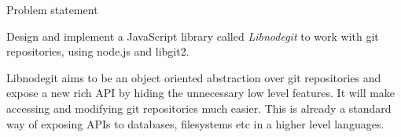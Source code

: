 \begin{center}
  {\huge Problem statement} \\[0.4cm]
\end{center}


Design and implement a JavaScript library called \textit{Libnodegit} to work
with git repositories, using node.js and libgit2.

Libnodegit aims to be an object oriented abstraction over git repositories and
expose a new rich API by hiding the unnecessary low level features. It will make
accessing and modifying git repositories much easier. This is already a standard
way of exposing APIs to databases, filesystems etc in a higher level languages.
